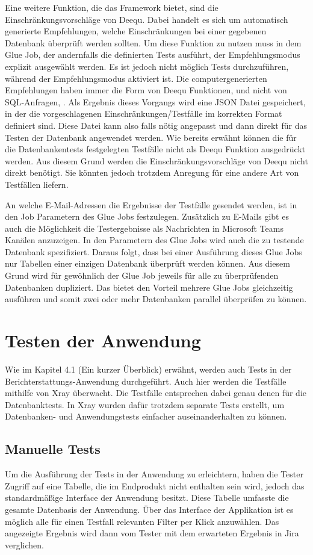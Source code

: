 Eine weitere Funktion, die das Framework bietet, sind die Einschränkungsvorschläge von Deequ. Dabei handelt es sich um automatisch generierte Empfehlungen, welche Einschränkungen bei einer gegebenen Datenbank überprüft werden sollten. Um diese Funktion zu nutzen muss in dem Glue Job, der andernfalls die definierten Tests ausführt, der Empfehlungsmodus explizit ausgewählt werden. Es ist jedoch nicht möglich Tests durchzuführen, während der  Empfehlungsmodus aktiviert ist. Die computergenerierten Empfehlungen haben immer die Form von Deequ Funktionen, und nicht von \ac{SQL}-Anfragen, . Als Ergebnis dieses Vorgangs wird eine \ac{JSON} Datei gespeichert, in der die vorgeschlagenen Einschränkungen/Testfälle im korrekten Format definiert sind. Diese Datei kann also falls nötig angepasst und dann direkt für das Testen der Datenbank angewendet werden. Wie bereits erwähnt können die für die Datenbankentests festgelegten Testfälle nicht als Deequ Funktion ausgedrückt werden. Aus diesem Grund werden die Einschränkungsvorschläge von Deequ nicht direkt benötigt. Sie könnten jedoch trotzdem Anregung für eine andere Art von Testfällen liefern.
\newline


An welche E-Mail-Adressen die Ergebnisse der Testfälle gesendet werden, ist in den Job Parametern des Glue Jobs festzulegen. Zusätzlich zu E-Mails gibt es auch die Möglichkeit die Testergebnisse als Nachrichten in Microsoft Teams Kanälen anzuzeigen. In den Parametern des Glue Jobs wird auch die zu testende Datenbank spezifiziert. Daraus folgt, dass bei einer Ausführung dieses Glue Jobs nur Tabellen einer einzigen Datenbank überprüft werden können. Aus diesem Grund wird für gewöhnlich der Glue Job jeweils für alle zu überprüfenden Datenbanken dupliziert. Das bietet den Vorteil mehrere Glue Jobs gleichzeitig ausführen und somit zwei oder mehr Datenbanken parallel überprüfen zu können.


\section{Testen der Anwendung}
Wie im Kapitel 4.1 (Ein kurzer Überblick) erwähnt, werden auch Tests in der Berichterstattungs-Anwendung durchgeführt. Auch hier werden die Testfälle mithilfe von Xray überwacht. Die Testfälle entsprechen dabei genau denen für die Datenbanktests. In Xray wurden dafür trotzdem separate Tests erstellt, um Datenbanken- und Anwendungstests einfacher auseinanderhalten zu können. 

\subsection{Manuelle Tests}
Um die Ausführung der Tests in der Anwendung zu erleichtern, haben die Tester Zugriff auf eine Tabelle, die im Endprodukt nicht enthalten sein wird, jedoch das standardmäßige Interface der Anwendung besitzt. Diese Tabelle umfasste die gesamte Datenbasis der Anwendung. Über das Interface der Applikation ist es möglich alle für einen Testfall relevanten Filter per Klick anzuwählen. Das angezeigte Ergebnis wird dann vom Tester mit dem erwarteten Ergebnis in Jira verglichen.

